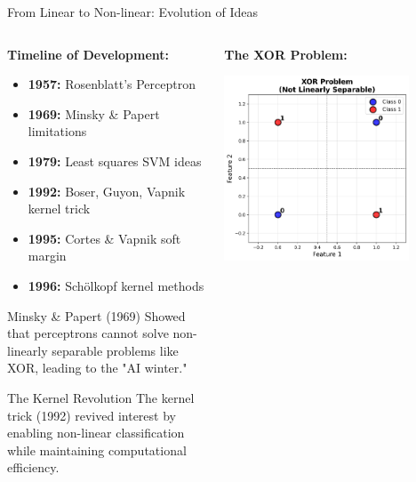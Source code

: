 \documentclass[8pt,aspectratio=1610]{beamer}
\begin{document}
\begin{frame}{From Linear to Non-linear: Evolution of Ideas}
\begin{columns}[t]
\begin{column}{0.48\textwidth}
\textbf{Timeline of Development:}
\vspace{0.2cm}

\begin{itemize}
\setlength{\itemsep}{2pt}
\item \textbf{1957:} Rosenblatt's Perceptron
\item \textbf{1969:} Minsky \& Papert limitations
\item \textbf{1979:} Least squares SVM ideas
\item \textbf{1992:} Boser, Guyon, Vapnik kernel trick
\item \textbf{1995:} Cortes \& Vapnik soft margin
\item \textbf{1996:} Schölkopf kernel methods
\end{itemize}

\vspace{0.3cm}
\begin{block}{Minsky \& Papert (1969)}
Showed that perceptrons cannot solve non-linearly separable problems like XOR, leading to the "AI winter."
\end{block}

\vspace{0.3cm}
\begin{alertblock}{The Kernel Revolution}
The kernel trick (1992) revived interest by enabling non-linear classification while maintaining computational efficiency.
\end{alertblock}
\end{column}

\begin{column}{0.48\textwidth}
\textbf{The XOR Problem:}
\vspace{0.2cm}

\centering
\includegraphics[width=0.8\textwidth]{../figures/xor_problem.png}


\end{column}
\end{columns}
\end{frame}
\end{document}

